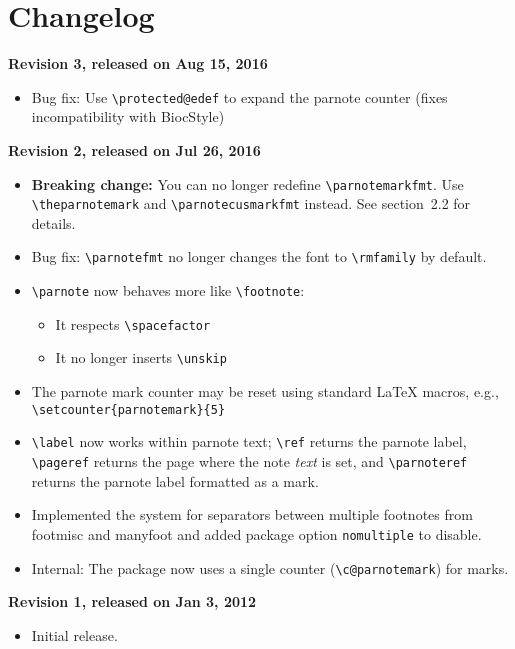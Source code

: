 \documentclass[10pt]{article}
\renewcommand{\parnotefmt}[1]{\centerline{\colorbox{black!10}{\parbox{0.82\textwidth}{\footnotesize\sffamily\noindent #1}}}}
\begin{document}
\section{Changelog}
{\raggedright
\noindent\textbf{Revision 3, released on Aug 15, 2016}
\begin{itemize}
\item Bug fix: Use \verb+\protected@edef+ to expand the parnote counter (fixes incompatibility with \textsf{BiocStyle})
\end{itemize}
\noindent\textbf{Revision 2, released on Jul 26, 2016}
\begin{itemize}
\item \textbf{Breaking change:} You can no longer redefine \verb+\parnotemarkfmt+. Use \verb+\theparnotemark+ and \verb+\parnotecusmarkfmt+ instead. See section~2.2 for details.
\item Bug fix: \verb+\parnotefmt+ no longer changes the font to \verb+\rmfamily+ by default.
\item \verb+\parnote+ now behaves more like \verb+\footnote+:
	\begin{itemize}
	\item It respects \verb+\spacefactor+
	\item It no longer inserts \verb+\unskip+
	\end{itemize}
\item The parnote mark counter may be reset using standard LaTeX macros, e.g., \verb+\setcounter{parnotemark}{5}+
\item \verb+\label+ now works within parnote text; \verb+\ref+ returns the parnote label, \verb+\pageref+ returns the page where the note \emph{text} is set, and \verb+\parnoteref+ returns the parnote label formatted as a mark.
\item Implemented the system for separators between multiple footnotes from \textsf{footmisc} and \textsf{manyfoot} and added package option \texttt{nomultiple} to disable.
\item Internal: The package now uses a single counter (\verb+\c@parnotemark+) for marks.
\end{itemize}
\noindent\textbf{Revision 1, released on Jan 3, 2012}
\begin{itemize}
\item Initial release.
\end{itemize}}
\end{document}
